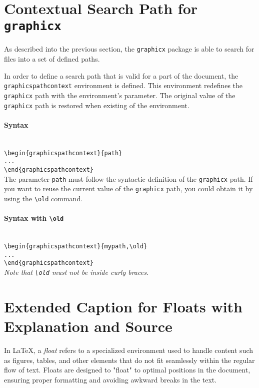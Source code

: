 \documentclass[book,taskpackage,specpackage,codepackage]{upmethodology-document}
\begin{document}
\section{Contextual Search Path for \texttt{graphicx}}

As described into the previous section, the \texttt{graphicx} package is able to search for files into a set of defined paths.

In order to define a search path that is valid for a part of the document, the \texttt{graphicspathcontext} environment is defined. This environment redefines the \texttt{graphicx} path with the environment's parameter. The original value of the \texttt{graphicx} path is restored when existing of the environment.

\paragraph{Syntax} \mbox{}\\
\texttt{{\textbackslash}begin\{graphicspathcontext\}\{path\}} \\
\texttt{...}\\
\texttt{{\textbackslash}end\{graphicspathcontext\}} \\


The parameter \texttt{path} must follow the syntactic definition of the \texttt{graphicx} path. If you want to reuse the current value of the \texttt{graphicx} path, you could obtain it by using the \texttt{{\textbackslash}old} command.

\paragraph{Syntax with \texttt{{\textbackslash}old}} \mbox{}\\
\texttt{{\textbackslash}begin\{graphicspathcontext\}\{{mypath},{\textbackslash}old\}} \\
\texttt{...}\\
\texttt{{\textbackslash}end\{graphicspathcontext\}} \\

\emph{Note that \texttt{{\textbackslash}old} must not be inside curly braces.}

\section{Extended Caption for Floats with Explanation and Source}

In \LaTeX, a \emph{float} refers to a specialized environment used to handle content such as figures, tables, and other elements that do not fit seamlessly within the regular flow of text.
Floats are designed to "float" to optimal positions in the document, ensuring proper formatting and avoiding awkward breaks in the text.
\end{document}
